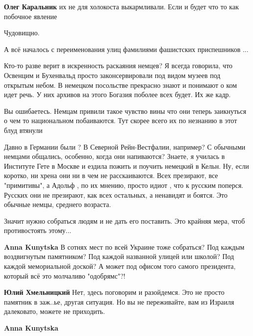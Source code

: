 \begin{itemize}
\begin{itemize}
\textbf{Олег Каральник} их не для холокоста выкармливали. Если и будет что то как побочное явление
\end{itemize} %

Чудовищно.

А всё началось с переименования улиц фамилиями фашистских приспешников ...


Кто-то разве верит в искренность раскаяния немцев? Я всегда говорила, что
Освенцим и Бухенвальд просто законсервировали под видом музеев под открытым
небом. В немецком посольстве прекрасно знают и понимают о ком идет речь. У них
архивов на этого Богазия поболее всех будет. Их же кадр.

\begin{itemize} %
Вы ошибаетесь. Немцам привили такое чувство вины что они теперь заикнуться о чем то национальном побаиваются. Тут скорее всего их по незнанию в этот блуд втянули


Давно в Германии были ? В Северной Рейн-Вестфалии, например? С обычными немцами
общались, особенно, когда они напиваются? Знаете, я училась в Институте Гете в
Москве и ездила пожить и поучить немецкий в Кельн. Ну, если коротко, ни хрена
они ни в чем не расскаиваются. Всех презирают, все "примитивы", а Адольф , по
их мнению, просто идиот , что к русским поперся. Русских они не презирают, как
всех остальных, а ненавидят и боятся. Это обычные немцы, среднего возраста.

\end{itemize} %


Значит нужно собраться людям и не дать его поставить. Это крайняя мера, чтоб
противостоять этому...

\begin{itemize} %
\textbf{Anna Kunytska}
В сотнях мест по всей Украине тоже собраться? Под каждым воздвигнутым памятником? Под каждой названной улицей или школой? Под каждой мемориальной доской?
А может под офисом того самого президента, который всё это молчаливо "одобрямс"?!

\textbf{Юлий Хмельницкий} Нет, здесь поговорим и разойдемся.
Это не просто памятник в заж..ье, другая ситуация.
Но вы не переживайте, вам из Израиля далековато, можете не приходить.

\textbf{Anna Kunytska}


\end{itemize}
\end{itemize}
